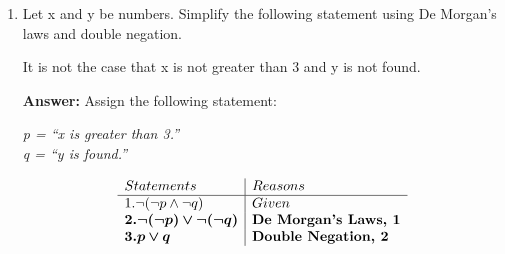\documentclass[12pt]{article}
\begin{document}
\begin{enumerate}
\item Let x and y be numbers. Simplify the following statement using De Morgan’s laws and double negation.
\begin{center}
  It is not the case that x is not greater than 3 and y is not found.
\end{center}
\textbf{Answer:} Assign the following statement:
\begin{center}
  \textit{p = \textquotedblleft x is greater than 3.\textquotedblright}\\
  \textit{q = \textquotedblleft y is found.\textquotedblright}
\end{center}
\begin{displaymath}
  \begin{array}{l|l c|c|c|c|c|}
  Statements & Reasons \\%
  \hline %
  1. \neg (\neg p \wedge \neg q) & Given \\
  \bm{2. \neg (\neg p) \vee \neg (\neg q)} & \textbf{De Morgan's Laws, 1} \\
  \bm{3. p \vee q} & \textbf{Double Negation, 2} \\
  \end{array}
\end{displaymath}

\end{enumerate}
\end{document}
